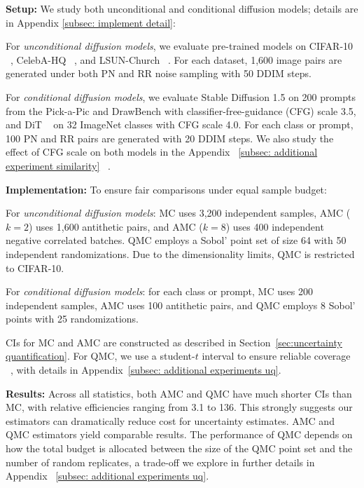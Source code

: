 \documentclass[12pt]{article}
\newcommand{\0}{\mathbf{0}}
\begin{document}
\textbf{Setup:} 
We study both unconditional and conditional diffusion models; details are in Appendix \ref{subsec: implement detail}:

For \emph{unconditional diffusion models}, we evaluate pre-trained models on CIFAR-10 ~\citep{cifar-10}, CelebA-HQ ~\citep{celeba-hq}, and LSUN-Church ~\citep{yu2015lsun}. For each dataset, 1,600 image pairs are generated under both PN and RR noise sampling with 50 DDIM steps. 

For \emph{conditional diffusion models}, we evaluate Stable Diffusion 1.5 on 200 prompts from the Pick-a-Pic \citep{kirstain2023pickapic} and DrawBench \citep{saharia2022photorealistic} with classifier-free-guidance (CFG) scale 3.5, and DiT ~\citep{peebles2023scalable} on 32 ImageNet classes with CFG scale 4.0. For each class or prompt, 100 PN and RR pairs are generated with 20 DDIM steps.  We also study the effect of CFG scale on both models in the Appendix ~\ref{subsec: additional experiment similarity} ~\citep{ho2022classifier}.

\textbf{Implementation:} 
To ensure fair comparisons under equal sample budget:

For \emph{unconditional diffusion models}: MC uses 3,200 independent samples, AMC ($k=2$) uses 1,600 antithetic pairs,  and AMC ($k=8$) uses 400 independent negative correlated batches.  QMC employs a Sobol’ point set of size 64 with 50 independent randomizations. Due to the dimensionality limits, QMC is restricted to CIFAR-10. 

For \emph{conditional diffusion models}: for each class or prompt, MC uses 200 independent samples, AMC uses 100 antithetic pairs, and QMC employs 8 Sobol’ points with 25 randomizations.

CIs for MC and AMC are constructed as described in Section~\ref{sec:uncertainty quantification}. For QMC, we use a student-$t$ interval to ensure reliable coverage ~\citep{lecuyer2023confidence}, with details in Appendix~\ref{subsec: additional experiments uq}.

\textbf{Results:}
Across all statistics, both AMC and QMC have much shorter CIs than MC, with relative efficiencies ranging from 3.1 to 136. This strongly suggests our estimators can dramatically reduce cost for uncertainty estimates. AMC and QMC estimators yield comparable results.
The performance of QMC depends on how the total budget is allocated between the size of the QMC point set and the number of random replicates, a trade-off we explore in further details in Appendix ~\ref{subsec: additional experiments uq}.
\end{document}
